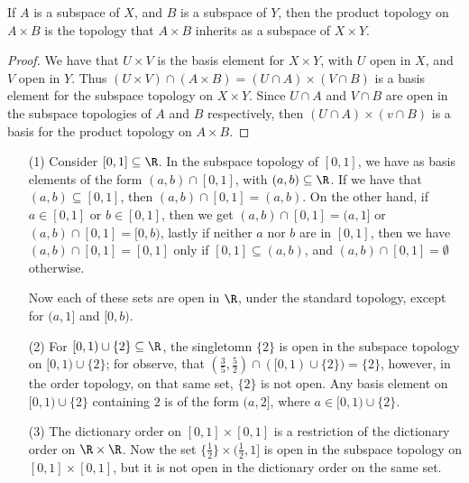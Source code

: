 \begin{theorem}\label{1.5.4}
    If $A$ is a subspace of  $X$, and  $B$ is a subspace of  $Y$, then the product topology on
     $A \times B$ is the topology that  $A \times B$ inherits as a subspace of  $X \times Y$.
\end{theorem}
\begin{proof}
    We have that $U \times V$ is the basis element for $X \times Y$, with  $U$ open in  $X$, and
    $V$ open in  $Y$. Thus  $(U \times V) \cap (A \times B)=(U \cap A) \times (V \cap B)$ is a basis element
    for the subspace topology on $X \times Y$. Since  $U \cap A$ and  $V \cap B$ are open in the subspace
    topologies of  $A$ and  $B$ respectively, then  $(U  \cap A) \times (v \cap B)$ is a basis for
    the product topology on $A \times B$.
\end{proof}

\begin{example}
    \begin{enumerate}
        \item[(1)] Consider $[0,1] \subseteq \R$. In the subspace topology of  $[0,1]$, we have as
            basis elements of the form $(a,b) \cap [0,1]$, with $(a,b) \subseteq \R$. If we have
            that  $(a,b) \subseteq [0,1]$, then $(a,b) \cap [0,1]=(a,b)$. On the other hand, if $a \in [0,1]$
            or $b \in [0,1]$, then we get $(a,b) \cap [0,1]=(a,1]$ or $(a,b) \cap [0,1]=[0,b)$, lastly if neither
            $a$ nor  $b$ are in $[0,1]$, then we have $(a,b) \cap [0,1]=[0,1]$ only if  $[0,1] \subseteq (a,b)$, and
            $(a,b) \cap [0,1]=\emptyset$ otherwise.

            Now each of these sets are open in $\R$, under the standard topology, except for $(a,1]$ and
            $[0,b)$.

        \item[(2)] For  $[0,1) \cup \{2\} \subseteq \R$, the singletomn  $\{2\}$ is open in the
            subspace topology on $[0,1) \cup \{2\}$; for observe, that $(\frac{3}{5},\frac{5}{2}) \cap
            ([0,1) \cup \{2\})=\{2\}$, however, in the order topology, on that same set, $\{2\}$ is not open.
            Any basis element on  $[0,1) \cup \{2\}$ containing  $2$ is of the form $(a,2]$, where
            $a \in [0,1) \cup \{2\}$.

        \item[(3)] The dictionary order on $[0,1] \times [0,1]$ is a restriction of the dictionary order
            on $\R \times \R$. Now the set  $\{\frac{1}{2}\} \times (\frac{1}{2},1]$ is open in the
            subspace topology on $[0,1] \times [0,1]$, but it is not open in the dictionary order on the
            same set.
    \end{enumerate}
\end{example}

